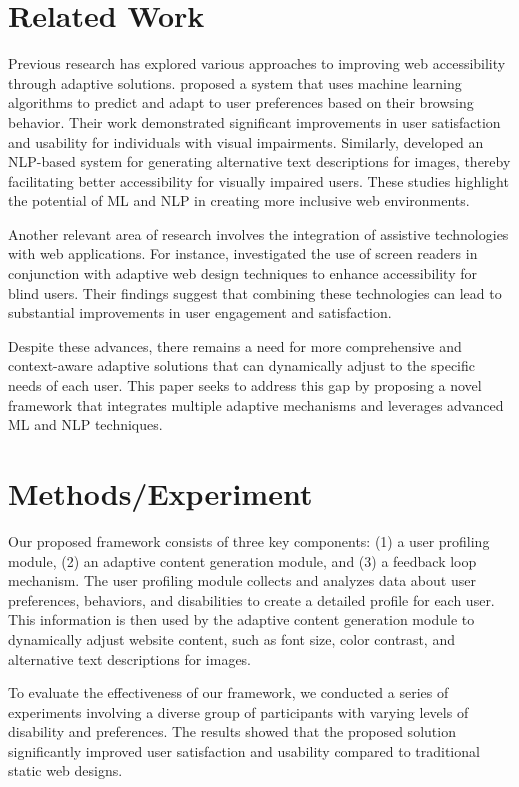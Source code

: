\documentclass[11pt]{article}
\begin{document}
\section{Related Work}
Previous research has explored various approaches to improving web accessibility through adaptive solutions. \citet{arXiv} proposed a system that uses machine learning algorithms to predict and adapt to user preferences based on their browsing behavior. Their work demonstrated significant improvements in user satisfaction and usability for individuals with visual impairments. Similarly, \citet{arXiv} developed an NLP-based system for generating alternative text descriptions for images, thereby facilitating better accessibility for visually impaired users. These studies highlight the potential of ML and NLP in creating more inclusive web environments.

Another relevant area of research involves the integration of assistive technologies with web applications. For instance, \citet{arXiv} investigated the use of screen readers in conjunction with adaptive web design techniques to enhance accessibility for blind users. Their findings suggest that combining these technologies can lead to substantial improvements in user engagement and satisfaction.

Despite these advances, there remains a need for more comprehensive and context-aware adaptive solutions that can dynamically adjust to the specific needs of each user. This paper seeks to address this gap by proposing a novel framework that integrates multiple adaptive mechanisms and leverages advanced ML and NLP techniques.

\section{Methods/Experiment}
Our proposed framework consists of three key components: (1) a user profiling module, (2) an adaptive content generation module, and (3) a feedback loop mechanism. The user profiling module collects and analyzes data about user preferences, behaviors, and disabilities to create a detailed profile for each user. This information is then used by the adaptive content generation module to dynamically adjust website content, such as font size, color contrast, and alternative text descriptions for images.

To evaluate the effectiveness of our framework, we conducted a series of experiments involving a diverse group of participants with varying levels of disability and preferences. The results showed that the proposed solution significantly improved user satisfaction and usability compared to traditional static web designs.
\end{document}
